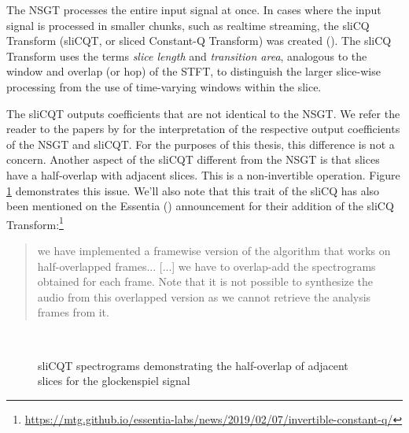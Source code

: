 \documentclass[report.tex]{subfiles}
\begin{document}
The NSGT processes the entire input signal at once. In cases where the input signal is processed in smaller chunks, such as realtime streaming, the sliCQ Transform (sliCQT, or sliced Constant-Q Transform) was created (\cite{invertiblecqt, slicq}). The sliCQ Transform uses the terms \textit{slice length} and \textit{transition area}, analogous to the window and overlap (or hop) of the STFT, to distinguish the larger slice-wise processing from the use of time-varying windows within the slice.

The sliCQT outputs coefficients that are not identical to the NSGT. We refer the reader to the papers by \textcite{invertiblecqt, slicq} for the interpretation of the respective output coefficients of the NSGT and sliCQT. For the purposes of this thesis, this difference is not a concern. Another aspect of the sliCQT different from the NSGT is that slices have a half-overlap with adjacent slices. This is a non-invertible operation. Figure \ref{fig:slicqoverlaps} demonstrates this issue. We'll also note that this trait of the sliCQ has also been mentioned on the Essentia (\cite{essentia}) announcement for their addition of the sliCQ Transform:\footnote{\url{https://mtg.github.io/essentia-labs/news/2019/02/07/invertible-constant-q/}}

\begin{quote}
	we have implemented a framewise version of the algorithm that works on half-overlapped frames... [...] we have to overlap-add the spectrograms obtained for each frame. Note that it is not possible to synthesize the audio from this overlapped version as we cannot retrieve the analysis frames from it.
\end{quote}

\begin{figure}[ht]
	\centering
	\\
	\caption{sliCQT spectrograms demonstrating the half-overlap of adjacent slices for the glockenspiel signal}
	\label{fig:slicqoverlaps}
\end{figure}
\end{document}
